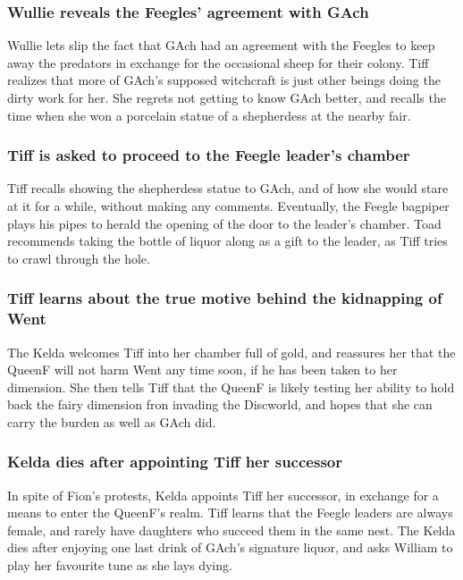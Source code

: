 \subsubsection{\Gls{Wullie} reveals the Feegles' agreement with \Gls{GAch}}
\Gls{Wullie} lets slip the fact that \Gls{GAch} had an agreement with the Feegles to keep away
the predators in exchange for the occasional sheep for their colony. \Gls{Tiff} realizes that more
of \Gls{GAch}'s supposed witchcraft is just other beings doing the dirty work for her. She regrets
not getting to know \Gls{GAch} better, and recalls the time when she won a porcelain statue of a
shepherdess at the nearby fair.

\subsubsection{\Gls{Tiff} is asked to proceed to the Feegle leader's chamber}
\Gls{Tiff} recalls showing the shepherdess statue to \Gls{GAch}, and of how she would stare at it
for a while, without making any comments. Eventually, the Feegle bagpiper plays his pipes to herald
the opening of the door to the leader's chamber. \Gls{Toad} recommends taking the bottle of liquor
along as a gift to the leader, as \Gls{Tiff} tries to crawl through the hole.

\subsubsection{\Gls{Tiff} learns about the true motive behind the kidnapping of \Gls{Went}}
The \Gls{Kelda} welcomes \Gls{Tiff} into her chamber full of gold, and reassures her that the
\Gls{QueenF} will not harm \Gls{Went} any time soon, if he has been taken to her dimension. She then
tells \Gls{Tiff} that the \Gls{QueenF} is likely testing her ability to hold back the fairy
dimension fron invading the Discworld, and hopes that she can carry the burden as well as \Gls{GAch}
did.

\subsubsection{\Gls{Kelda} dies after appointing \Gls{Tiff} her successor}
In spite of \Gls{Fion}'s protests, \Gls{Kelda} appoints \Gls{Tiff} her successor, in exchange for
a means to enter the \Gls{QueenF}'s realm. \Gls{Tiff} learns that the Feegle leaders are always
female, and rarely have daughters who succeed them in the same nest. The \Gls{Kelda} dies after
enjoying one last drink of \Gls{GAch}'s signature liquor, and asks \Gls{William} to play her
favourite tune as she lays dying.

